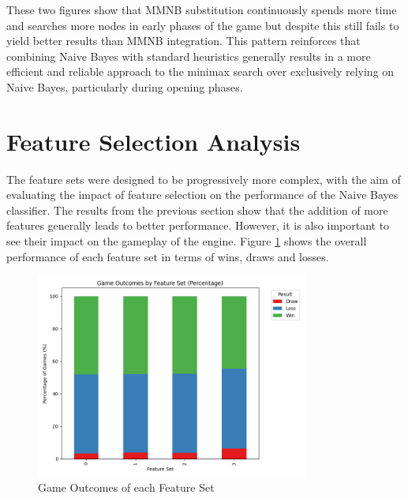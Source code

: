 These two figures show that MMNB substitution continuously spends more time and searches more nodes in early phases of the game but despite this still fails to yield better results than MMNB integration. This pattern reinforces that combining Naive Bayes with standard heuristics generally results in a more efficient and reliable approach to the minimax search over exclusively relying on Naive Bayes, particularly during opening phases.


\section{Feature Selection Analysis}

The feature sets were designed to be progressively more complex, with the aim of evaluating the impact of feature selection on the performance of the Naive Bayes classifier. The results from the previous section show that the addition of more features generally leads to better performance. However, it is also important to see their impact on the gameplay of the engine. Figure \ref{fig: feature_set_vs_win_rate} shows the overall performance of each feature set in terms of wins, draws and losses.
\begin{figure}[H]
    \centering
    \includegraphics[width=0.8\textwidth]{images/plots/featureSet/Feature_set_vs_win_rate.png}
    \caption{Game Outcomes of each Feature Set}
    \label{fig: feature_set_vs_win_rate}
\end{figure}





